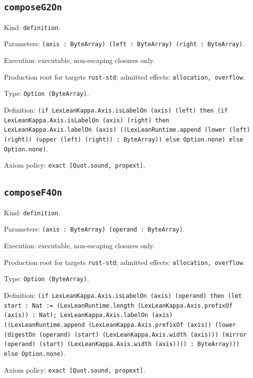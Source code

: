 \documentclass[11pt]{article}
\begin{document}
\subsection*{\texttt{composeG2On}}
\noindent Kind: \texttt{definition}.\par
\noindent Parameters: \texttt{(axis : ByteArray) (left : ByteArray) (right : ByteArray)}.\par
\noindent Execution: executable, non-escaping closures only.\par
\noindent Production root for targets \texttt{rust-std}; admitted effects: \texttt{allocation, overflow}.\par
\noindent Type: \texttt{Option (ByteArray)}.\par
\noindent Definition: \texttt{(if LexLeanKappa.Axis.isLabelOn (axis) (left) then (if LexLeanKappa.Axis.isLabelOn (axis) (right) then LexLeanKappa.Axis.labelOn (axis) ((LexLeanRuntime.append (lower (left) (right)) (upper (left) (right)) : ByteArray)) else Option.none) else Option.none)}.\par
\noindent Axiom policy: \texttt{exact [Quot.sound, propext]}.\par
\subsection*{\texttt{composeF4On}}
\noindent Kind: \texttt{definition}.\par
\noindent Parameters: \texttt{(axis : ByteArray) (operand : ByteArray)}.\par
\noindent Execution: executable, non-escaping closures only.\par
\noindent Production root for targets \texttt{rust-std}; admitted effects: \texttt{allocation, overflow}.\par
\noindent Type: \texttt{Option (ByteArray)}.\par
\noindent Definition: \texttt{(if LexLeanKappa.Axis.isLabelOn (axis) (operand) then (let start : Nat := (LexLeanRuntime.length (LexLeanKappa.Axis.prefixOf (axis)) : Nat); LexLeanKappa.Axis.labelOn (axis) ((LexLeanRuntime.append (LexLeanKappa.Axis.prefixOf (axis)) (lower (digestOn (operand) (start) (LexLeanKappa.Axis.width (axis))) (mirror (operand) (start) (LexLeanKappa.Axis.width (axis)))) : ByteArray))) else Option.none)}.\par
\noindent Axiom policy: \texttt{exact [Quot.sound, propext]}.\par
\end{document}
